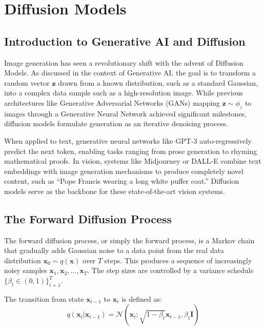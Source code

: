\chapter{Diffusion Models}
\label{ch:diffusion_models}

\section{Introduction to Generative AI and Diffusion}

Image generation has seen a revolutionary shift with the advent of Diffusion Models. As discussed in the context of Generative AI, the goal is to transform a random vector $\mathbf{z}$ drawn from a known distribution, such as a standard Gaussian, into a complex data sample such as a high-resolution image. While previous architectures like Generative Adversarial Networks (GANs) mapping $\mathbf{z} \sim \phi_z$ to images through a Generative Neural Network achieved significant milestones, diffusion models formulate generation as an iterative denoising process. 

\begin{insightbox}
When applied to text, generative neural networks like GPT-3 auto-regressively predict the next token, enabling tasks ranging from prose generation to rhyming mathematical proofs. In vision, systems like Midjourney or DALL-E combine text embeddings with image generation mechanisms to produce completely novel content, such as ``Pope Francis wearing a long white puffer coat.'' Diffusion models serve as the backbone for these state-of-the-art vision systems.
\end{insightbox}

\section{The Forward Diffusion Process}

The forward diffusion process, or simply the forward process, is a Markov chain that gradually adds Gaussian noise to a data point from the real data distribution $\mathbf{x}_0 \sim q(\mathbf{x})$ over $T$ steps. This produces a sequence of increasingly noisy samples $\mathbf{x}_1, \mathbf{x}_2, \dots, \mathbf{x}_T$. The step sizes are controlled by a variance schedule $\{\beta_t \in (0, 1)\}_{t=1}^T$.

The transition from state $\mathbf{x}_{t-1}$ to $\mathbf{x}_t$ is defined as:
\begin{equation}
    q(\mathbf{x}_t | \mathbf{x}_{t-1}) = \mathcal{N}(\mathbf{x}_t; \sqrt{1 - \beta_t}\mathbf{x}_{t-1}, \beta_t \mathbf{I})
\end{equation}

